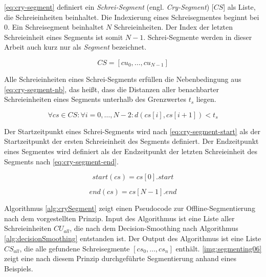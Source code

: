 \autoref{eq:cry-segment} definiert ein \emph{Schrei-Segment} (engl. \emph{Cry-Segment}) [$CS$] als Liste, die Schreieinheiten beinhaltet. Die Indexierung eines Schreisegmentes beginnt bei $0$. Ein Schreisegment beinhaltet $N$ Schreieinheiten. Der Index der letzten Schreieinheit eines Segments ist somit $N-1$. Schrei-Segmente werden in dieser Arbeit auch kurz nur als \emph{Segment} bezeichnet.

\begin{equation}
CS = [cu_0 ,  \ldots,  cu_{N-1}]
\label{eq:cry-segment}
\end{equation}

Alle Schreieinheiten eines Schrei-Segments erfüllen die Nebenbedingung aus \autoref{eq:cry-segment-nb}, das heißt, dass die Distanzen aller benachbarter Schreieinheiten eines Segments unterhalb des Grenzwertes $t_{s}$ liegen.


\begin{equation}
\forall cs \in CS: \forall i = 0 , \ldots , N-2 : d(cs[i], cs[i+1]) < t_{s}
\label{eq:cry-segment-nb}
\end{equation}

Der Startzeitpunkt eines Schrei-Segments wird nach \autoref{eq:cry-segment-start} als der Startzeitpunkt der ersten Schreieinheit des Segments definiert. Der Endzeitpunkt eines Segmentes wird definiert als der Endzeitpunkt der letzten Schreieinheit des Segments nach \autoref{eq:cry-segment-end}.

\begin{equation}
start(cs) = cs[0].start
\label{eq:cry-segment-start}
\end{equation}

\begin{equation}
end(cs) = cs[N-1].end
\label{eq:cry-segment-end}
\end{equation}

Algorithmus \ref{alg:crySegment} zeigt einen Pseudocode zur Offline-Segmentierung nach dem vorgestellten Prinzip. Input des Algorithmus ist eine Liste aller Schreieinheiten $CU_{all}$, die nach dem Decision-Smoothing nach Algorithmus \ref{alg:decisionSmoothing} entstanden ist. Der Output des Algorithmus ist eine Liste $CS_{all}$, die alle gefundene Schreisegmente  $[cs_0 , \ldots ,  cs_n]$ enthält. \autoref{img:segmenting06} zeigt eine nach diesem Prinzip durchgeführte Segmentierung anhand eines Beispiels.

